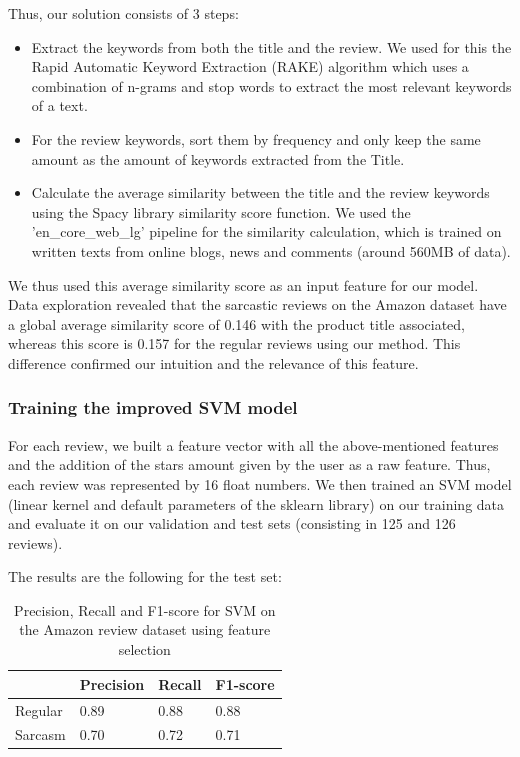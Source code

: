 \documentclass[10pt,twocolumn,letterpaper]{article}
\begin{document}
Thus, our solution consists of 3 steps:
\begin{itemize}
    \item Extract the keywords from both the title and the review. We used for this the Rapid Automatic Keyword Extraction (RAKE) algorithm which uses a combination of n-grams and stop words to extract the most relevant keywords of a text.~\cite{rake2010}
    \item For the review keywords, sort them by frequency and only keep the same amount as the amount of keywords extracted from the Title.
    \item Calculate the average similarity between the title and the review keywords using the Spacy library similarity score function. We used the 'en\_core\_web\_lg' pipeline for the similarity calculation, which is trained on written texts from online blogs, news and comments (around 560MB of data).
\end{itemize}

We thus used this average similarity score as an input feature for our model.
Data exploration revealed that the sarcastic reviews on the Amazon dataset have a global average similarity score of 0.146 with the product title associated, whereas this score is 0.157 for the regular reviews using our method.
This difference confirmed our intuition and the relevance of this feature.

\subsubsection{Training the improved SVM model}

For each review, we built a feature vector with all the above-mentioned features and the addition of the stars amount given by the user as a raw feature.
Thus, each review was represented by 16 float numbers.
We then trained an SVM model (linear kernel and default parameters of the sklearn library) on our training data and evaluate it on our validation and test sets (consisting in 125 and 126 reviews).

The results are the following for the test set:

\begin{table}[H]
    \centering
    \begin{tabularx}{\linewidth}{|X|X|X|X|}
        \hline
        & Precision & Recall & F1-score \\
        \hline
        Regular & 0.89 & 0.88 & 0.88 \\
        \hline
        Sarcasm & 0.70 & 0.72 & 0.71 \\
        \hline
    \end{tabularx}
    \caption{Precision, Recall and F1-score for SVM on the Amazon review dataset using feature selection}
\end{table}
\end{document}
